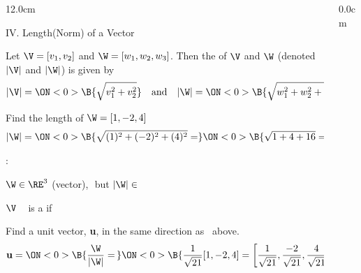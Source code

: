 \begin{frame}
\begin{columns}
\begin{column}{12.0cm}

{IV. Length(Norm) of a Vector}

\vspace{0.2cm}

\scriptsize

\DEF Let $\V = [v_1,v_2]$ and $\W = [w_1,w_2,w_3]$.  Then the  of $\V$ and $\W$ (denoted $|\V|$ and $|\W|$) is given by
\begin{align*}
	|\V| = \ON<0>{\B{\sqrt{v_1^2 + v_2^2}}} \quad \text{and} \quad |\W| = \ON<0>{\B{\sqrt{w_1^2 + w_2^2 + w_3^2}}}
\end{align*}

\EX Find the length of $\W = [1,-2,4]$
\begin{align*}
	|\W| = \ON<0>{\B{\sqrt{(1)^2 + (-2)^2 + (4)^2} =}} \ON<0>{\B{\sqrt{1+4+16} = \sqrt{21}}}
\end{align*}

:

\vspace{0.1cm}

\OBUL $\W \in \RE^3$ (vector),\,\, but $|\W| \in $ \\

\vspace{0.4cm}

\DEF $\V$ \,\,\, is a  if \,\,\, 

\vspace{0.4cm}

\EX Find a unit vector, {\bf u}, in the same direction as \W \, above.
\begin{align*}
	{\bf u} = \ON<0>{\B{\frac{\W}{|\W|} =\,}} \ON<0>{\B{\frac{1}{\sqrt{21}}[1,-2,4] = \left[\frac{1}{\sqrt{21}},\frac{-2}{\sqrt{21}},\frac{4}{\sqrt{21}}\right]}} \\
\end{align*}

\end{column}
\begin{column}{0.0cm}\end{column}
\end{columns}
\end{frame}

